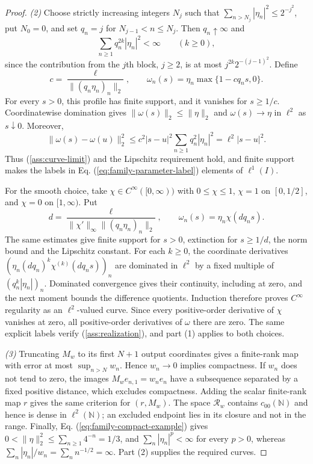 \documentclass[11pt]{article}
\newcommand{\N}{\mathbb N}
\theoremstyle{definition}
\theoremstyle{remark}
\begin{document}
\begin{proof}
\noindent\textit{(2)} Choose strictly increasing integers $N_j$ such that $\sum_{n>N_j}|\eta_n|^2\le2^{-j^2}$, put $N_0=0$, and set $q_n=j$ for $N_{j-1}<n\le N_j$. Then $q_n\uparrow\infty$ and
\[
\sum_{n\ge1}q_n^{2k}|\eta_n|^2<\infty\qquad(k\ge0),
\]
since the contribution from the $j$th block, $j\ge2$, is at most $j^{2k}2^{-(j-1)^2}$. Define
\begin{equation}
c=\frac{\ell}{\|(q_n\eta_n)_n\|_2},\qquad
\omega_n(s)=\eta_n\max\{1-cq_ns,0\}.
\label{eq:family-linear-cutoff}
\end{equation}
For every $s>0$, this profile has finite support, and it vanishes for $s\ge1/c$. Coordinatewise domination gives $\|\omega(s)\|_2\le\|\eta\|_2$ and $\omega(s)\to\eta$ in $\ell^2$ as $s\downarrow0$. Moreover,
\[
\|\omega(s)-\omega(u)\|_2^2
\le c^2|s-u|^2\sum_{n\ge1}q_n^2|\eta_n|^2
=\ell^2|s-u|^2.
\]
Thus \textup{(\ref{ass:curve-limit})} and the Lipschitz requirement hold, and finite support makes the labels in Eq. (\ref{eq:family-parameter-label}) elements of $\ell^1(I)$.

For the smooth choice, take $\chi\in C^\infty([0,\infty))$ with $0\le\chi\le1$, $\chi=1$ on $[0,1/2]$, and $\chi=0$ on $[1,\infty)$. Put
\begin{equation}
d=\frac{\ell}{\|\chi'\|_\infty\|(q_n\eta_n)_n\|_2},\qquad
\omega_n(s)=\eta_n\chi(dq_ns).
\label{eq:family-smooth-cutoff}
\end{equation}
The same estimates give finite support for $s>0$, extinction for $s\ge1/d$, the norm bound and the Lipschitz constant. For each $k\ge0$, the coordinate derivatives $(\eta_n(dq_n)^k\chi^{(k)}(dq_ns))_n$ are dominated in $\ell^2$ by a fixed multiple of $(q_n^k|\eta_n|)_n$. Dominated convergence gives their continuity, including at zero, and the next moment bounds the difference quotients. Induction therefore proves $C^\infty$ regularity as an $\ell^2$-valued curve. Since every positive-order derivative of $\chi$ vanishes at zero, all positive-order derivatives of $\omega$ there are zero. The same explicit labels verify \textup{(\ref{ass:realization})}, and part (1) applies to both choices.

\noindent\textit{(3)} Truncating $M_w$ to its first $N+1$ output coordinates gives a finite-rank map with error at most $\sup_{n>N}w_n$. Hence $w_n\to0$ implies compactness. If $w_n$ does not tend to zero, the images $M_we_{n,1}=w_ne_n$ have a subsequence separated by a fixed positive distance, which excludes compactness. Adding the scalar finite-rank map $r$ gives the same criterion for $(r,M_w)$. The space $\mathcal R_w$ contains $c_{00}(\N)$ and hence is dense in $\ell^2(\N)$; an excluded endpoint lies in its closure and not in the range. Finally, Eq. (\ref{eq:family-compact-example}) gives $0<\|\eta\|_2^2\le\sum_{n\ge1}4^{-n}=1/3$, and $\sum_n|\eta_n|^p<\infty$ for every $p>0$, whereas $\sum_n|\eta_n|/w_n=\sum_n n^{-1/2}=\infty$. Part (2) supplies the required curves.
\end{proof}
\end{document}
